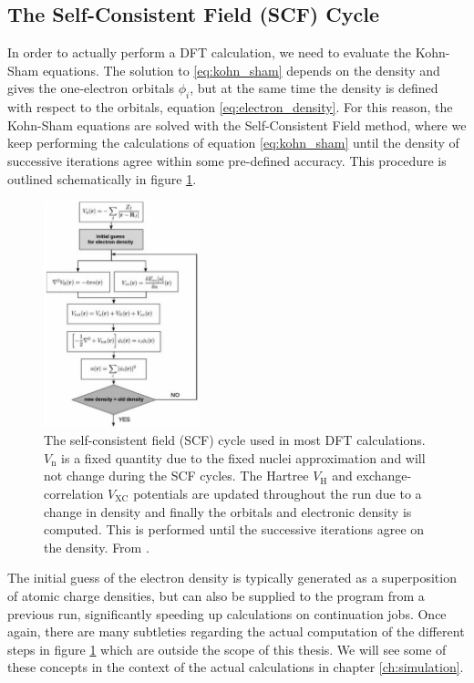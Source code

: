 \subsection{The Self-Consistent Field (SCF) Cycle}
In order to actually perform a DFT calculation, we need to evaluate the Kohn-Sham equations. The solution to \eqref{eq:kohn_sham} depends on the density and gives the one-electron orbitals $\phi_i$, but at the same time the density is defined with respect to the orbitals, equation \eqref{eq:electron_density}. For this reason, the Kohn-Sham equations are solved with the Self-Consistent Field method, where we keep performing the calculations of equation \eqref{eq:kohn_sham} until the density of successive iterations agree within some pre-defined accuracy. This procedure is outlined schematically in figure \ref{fig:scf}.

\begin{figure}
	\centering
	\includegraphics[width=0.4\textwidth]{fig/method/dft/scf_cycle.png}
	\caption{The self-consistent field (SCF) cycle used in most DFT calculations. $V_\text{n}$ is a fixed quantity due to the fixed nuclei approximation and will not change during the SCF cycles. The Hartree $V_\text{H}$ and exchange-correlation $V_\text{XC}$ potentials are updated throughout the run due to a change in density and finally the orbitals and electronic density is computed. This is performed until the successive iterations agree on the density. From \cite{Giustino2014}.}
	\label{fig:scf}
\end{figure}

The initial guess of the electron density is typically generated as a superposition of atomic charge densities, but can also be supplied to the program from a previous run, significantly speeding up calculations on continuation jobs. Once again, there are many subtleties regarding the actual computation of the different steps in figure \ref{fig:scf} which are outside the scope of this thesis. We will see some of these concepts in the context of the actual calculations in chapter \ref{ch:simulation}.

